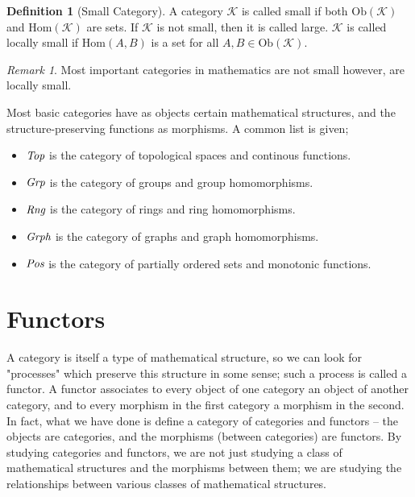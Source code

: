 \documentclass[10pt, oneside, reqno]{amsart}
\theoremstyle{plain}%
\theoremstyle{definition}
\newtheorem{defn}[thm]{Definition}
\theoremstyle{remark}
\newtheorem*{rem}{Remark}
\newcommand{\Cat}{\mathcal{K}}
\begin{document}
\begin{defn}[Small Category]
	A category $\Cat$ is called small if both $\text{Ob}(\Cat)$ and $\text{Hom}(\Cat)$ are sets.
	If $\Cat$ is not small, then it is called large.
	$\Cat$ is called locally small if $\text{Hom}(A,B)$ is a set for all $A, B \in \text{Ob}(\Cat)$.
\end{defn}

\begin{rem}
	Most important categories in mathematics are not small however, are locally small.
\end{rem}

Most basic categories have as objects certain mathematical structures, and the structure-preserving
functions as morphisms. A common list is given;
\begin{itemize}
 \item $\emph{Top}$ is the category of topological spaces and continous functions.
 \item $\emph{Grp}$ is the category of groups and group homomorphisms.
 \item $\emph{Rng}$ is the category of rings and ring homomorphisms.
 \item $\emph{Grph}$ is the category of graphs and graph homomorphisms.
 \item $\emph{Pos}$ is the category of partially ordered sets and monotonic functions.
\end{itemize}


\section{Functors} %
\label{sec:functors}
A category is itself a type of mathematical structure, so we can look for "processes" which preserve this structure in some sense; such a process is called a functor.
A functor associates to every object of one category an object of another category, and to every morphism in the first category a morphism in the second.
In fact, what we have done is define a category of categories and functors – the objects are categories, and the morphisms (between categories) are functors.
By studying categories and functors, we are not just studying a class of mathematical structures and the morphisms between them;
we are studying the relationships between various classes of mathematical structures.
\end{document}
